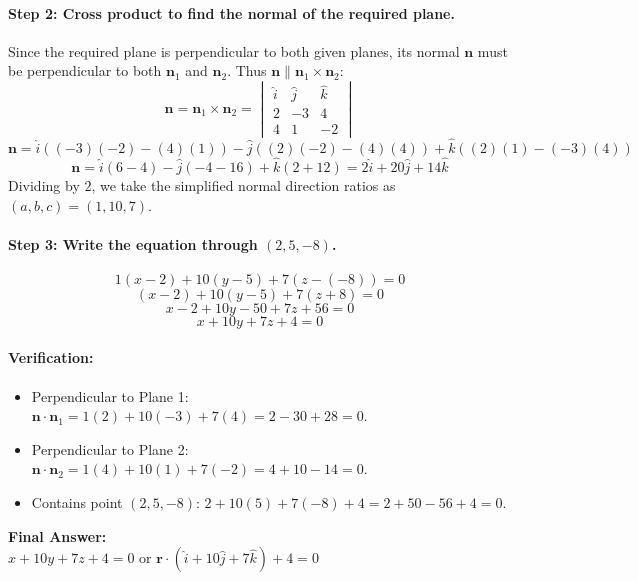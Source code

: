 \documentclass[11pt,a4paper]{article}
\begin{document}
\paragraph{Step 2: Cross product to find the normal of the required plane.}
Since the required plane is perpendicular to both given planes, its normal $\mathbf{n}$ must be perpendicular to both $\mathbf{n}_1$ and $\mathbf{n}_2$. Thus $\mathbf{n} \parallel \mathbf{n}_1 \times \mathbf{n}_2$:
$$\mathbf{n} = \mathbf{n}_1 \times \mathbf{n}_2 = \begin{vmatrix} \hat{i} & \hat{j} & \hat{k} \\ 2 & -3 & 4 \\ 4 & 1 & -2 \end{vmatrix}$$
$$\mathbf{n} = \hat{i}((-3)(-2) - (4)(1)) - \hat{j}((2)(-2) - (4)(4)) + \hat{k}((2)(1) - (-3)(4))$$
$$\mathbf{n} = \hat{i}(6 - 4) - \hat{j}(-4 - 16) + \hat{k}(2 + 12) = 2\hat{i} + 20\hat{j} + 14\hat{k}$$
Dividing by $2$, we take the simplified normal direction ratios as $(a, b, c) = (1, 10, 7)$.

\paragraph{Step 3: Write the equation through $(2, 5, -8)$.}
$$1(x - 2) + 10(y - 5) + 7(z - (-8)) = 0$$
$$(x - 2) + 10(y - 5) + 7(z + 8) = 0$$
$$x - 2 + 10y - 50 + 7z + 56 = 0$$
$$x + 10y + 7z + 4 = 0$$

\paragraph{Verification:}
\begin{itemize}
    \item Perpendicular to Plane 1: $\mathbf{n} \cdot \mathbf{n}_1 = 1(2) + 10(-3) + 7(4) = 2 - 30 + 28 = 0$. \checkmark
    \item Perpendicular to Plane 2: $\mathbf{n} \cdot \mathbf{n}_2 = 1(4) + 10(1) + 7(-2) = 4 + 10 - 14 = 0$. \checkmark
    \item Contains point $(2, 5, -8)$: $2 + 10(5) + 7(-8) + 4 = 2 + 50 - 56 + 4 = 0$. \checkmark
\end{itemize}

\begin{resultbox}
\textbf{Final Answer:}\\
$\boxed{x + 10y + 7z + 4 = 0}$ \quad or \quad $\boxed{\mathbf{r} \cdot (\hat{i} + 10\hat{j} + 7\hat{k}) + 4 = 0}$
\end{resultbox}
\end{document}
